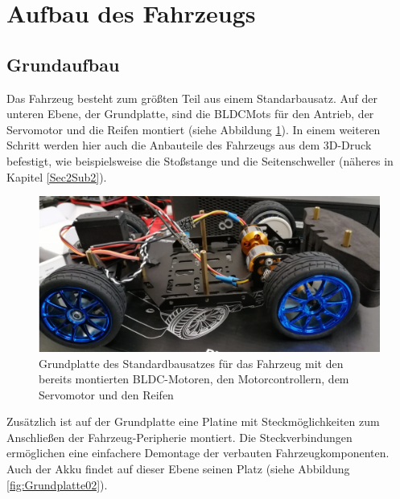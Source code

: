 

\pagestyle{fancy}
\rhead{\thepage} \chead{} 
\cfoot{}

\section{Aufbau des Fahrzeugs}\label{Sec2}

\subsection{Grundaufbau}\label{Sec2Sub1}

Das Fahrzeug besteht zum größten Teil aus einem Standarbausatz. Auf der unteren Ebene, der Grundplatte, sind die \acp{BLDCMot} für den Antrieb, der Servomotor und die Reifen montiert (siehe Abbildung \ref{fig:Grundplatte01}). In einem weiteren Schritt werden hier auch die Anbauteile des Fahrzeugs aus dem 3D-Druck befestigt, wie beispielsweise die Stoßstange und die Seitenschweller (näheres in Kapitel \ref{Sec2Sub2}).

\begin{figure}[H] %
\includegraphics[width=.90\textwidth]{sec2/images/Grundaufbau/Grundplatte01} 
\centering
\captionsetup{width=.95\textwidth}
\caption[Grundplatte des Standardbausatzes für das Fahrzeug]{Grundplatte des Standardbausatzes für das Fahrzeug mit den bereits montierten BLDC-Motoren, den Motorcontrollern, dem Servomotor und den Reifen}\centering
\label{fig:Grundplatte01}
\end{figure}

Zusätzlich ist auf der Grundplatte eine Platine mit Steckmöglichkeiten zum Anschließen der Fahrzeug-Peripherie montiert. Die Steckverbindungen ermöglichen eine einfachere Demontage der verbauten Fahrzeugkomponenten. Auch der Akku findet auf dieser Ebene seinen Platz (siehe Abbildung \ref{fig:Grundplatte02}).

